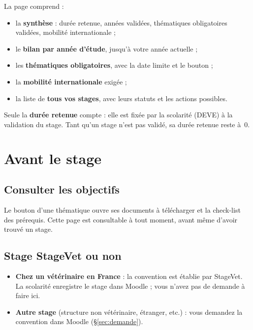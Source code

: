 \documentclass[11pt,a4paper]{article}
\begin{document}

La page comprend :
\begin{itemize}
  \item la \textbf{synthèse} : durée retenue, années validées, thématiques
        obligatoires validées, mobilité internationale ;
  \item le \textbf{bilan par année d'étude}, jusqu'à votre année actuelle ;
  \item les \textbf{thématiques obligatoires}, avec la date limite et le bouton
         ;
  \item la \textbf{mobilité internationale} exigée ;
  \item la liste de \textbf{tous vos stages}, avec leurs statuts et les actions
        possibles.
\end{itemize}


Seule la \textbf{durée retenue} compte : elle est fixée par la scolarité (DEVE)
à la validation du stage. Tant qu'un stage n'est pas validé, sa durée retenue
reste à~0.

\section{Avant le stage}

\subsection{Consulter les objectifs}

Le bouton  d'une thématique ouvre ses documents à télécharger
et la check-list des prérequis. Cette page est consultable à tout
moment, avant même d'avoir trouvé un stage.


\subsection{Stage StageVet ou non}

\begin{itemize}
  \item \textbf{Chez un vétérinaire en France} : la convention est établie par
        StageVet. La scolarité enregistre le stage dans Moodle ; vous n'avez pas
        de demande à faire ici.
  \item \textbf{Autre stage} (structure non vétérinaire, étranger, etc.) : vous
        demandez la convention dans Moodle (§\ref{sec:demande}).
\end{itemize}
\end{document}
